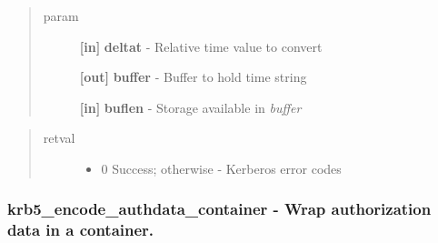 \documentclass[letterpaper,10pt,english]{sphinxmanual}
\begin{document}
\begin{quote}\begin{description}
\item[{param}] \leavevmode
\textbf{{[}in{]}} \textbf{deltat} - Relative time value to convert

\textbf{{[}out{]}} \textbf{buffer} - Buffer to hold time string

\textbf{{[}in{]}} \textbf{buflen} - Storage available in \emph{buffer}

\end{description}\end{quote}
\begin{quote}\begin{description}
\item[{retval}] \leavevmode\begin{itemize}
\item {} 
0   Success; otherwise - Kerberos error codes

\end{itemize}

\end{description}\end{quote}


\subsubsection{krb5\_encode\_authdata\_container -  Wrap authorization data in a container.}
\label{appdev/refs/api/krb5_encode_authdata_container::doc}\label{appdev/refs/api/krb5_encode_authdata_container:krb5-encode-authdata-container-wrap-authorization-data-in-a-container}

\begin{fulllineitems}
\label{appdev/refs/api/krb5_encode_authdata_container:krb5_encode_authdata_container}
\end{fulllineitems}
\end{document}
